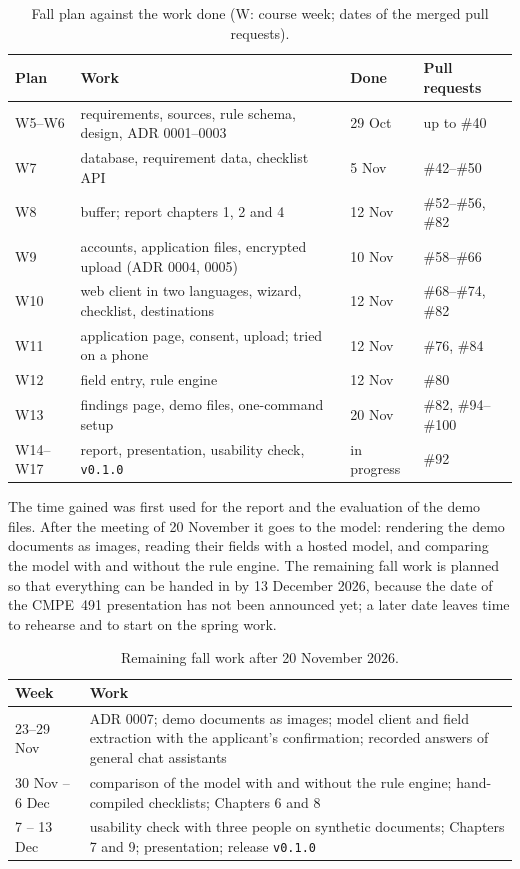 \begin{table}[ht]
  \centering
  \small
  \caption{Fall plan against the work done (W: course week; dates of the merged pull requests).}
  \label{tab:schedule}
  \begin{tabularx}{\textwidth}{@{}l>{\raggedright\arraybackslash}Xll@{}}
    \toprule
    Plan & Work & Done & Pull requests \\
    \midrule
    W5--W6 & requirements, sources, rule schema, design, ADR 0001--0003 & 29 Oct & up to \#40 \\
    W7 & database, requirement data, checklist API & 5 Nov & \#42--\#50 \\
    W8 & buffer; report chapters 1, 2 and 4 & 12 Nov & \#52--\#56, \#82 \\
    W9 & accounts, application files, encrypted upload (ADR 0004, 0005) & 10 Nov & \#58--\#66 \\
    W10 & web client in two languages, wizard, checklist, destinations & 12 Nov & \#68--\#74, \#82 \\
    W11 & application page, consent, upload; tried on a phone & 12 Nov & \#76, \#84 \\
    W12 & field entry, rule engine & 12 Nov & \#80 \\
    W13 & findings page, demo files, one-command setup & 20 Nov & \#82, \#94--\#100 \\
    W14--W17 & report, presentation, usability check, \texttt{v0.1.0} & in progress & \#92 \\
    \bottomrule
  \end{tabularx}
\end{table}

The time gained was first used for the report and the evaluation of the demo files. After the
meeting of 20 November it goes to the model: rendering the demo documents as images, reading
their fields with a hosted model, and comparing the model with and without the rule engine. The
remaining fall work is planned so that everything can be handed in by 13 December 2026, because
the date of the CMPE~491 presentation has not been announced yet; a later date leaves time to
rehearse and to start on the spring work.

\begin{table}[ht]
  \centering
  \small
  \caption{Remaining fall work after 20 November 2026.}
  \label{tab:remaining}
  \begin{tabularx}{\textwidth}{@{}l>{\raggedright\arraybackslash}X@{}}
    \toprule
    Week & Work \\
    \midrule
    23--29 Nov & ADR 0007; demo documents as images; model client and field extraction with the
      applicant's confirmation; recorded answers of general chat assistants \\
    30 Nov -- 6 Dec & comparison of the model with and without the rule engine; hand-compiled
      checklists; Chapters 6 and 8 \\
    7 -- 13 Dec & usability check with three people on synthetic documents; Chapters 7 and 9;
      presentation; release \texttt{v0.1.0} \\
    \bottomrule
  \end{tabularx}
\end{table}

